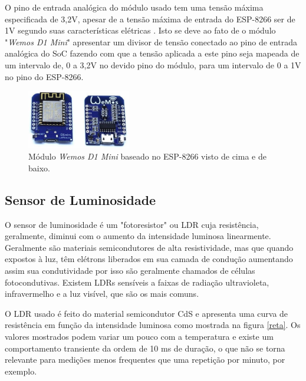 O pino de entrada analógica do módulo usado tem uma tensão máxima especificada de 3,2V, apesar de a tensão máxima de entrada do ESP-8266 ser de 1V segundo suas características elétricas \cite{esp}. Isto se deve ao fato de o módulo "\textit{Wemos D1 Mini}" apresentar um divisor de tensão conectado ao pino de entrada analógica do SoC fazendo com que a tensão aplicada a este pino seja mapeada de um intervalo de, 0 a 3,2V no devido pino do módulo, para um intervalo de 0 a 1V no pino do ESP-8266.

\begin{figure}[ht]
    \begin{center}
    \includegraphics[width=0.4\textwidth]{figuras/wemos.PNG}
    \end{center}
    \caption[Ilustração do módulo \textit{Wemos D1 Mini}.]{Módulo \textit{Wemos D1 Mini} baseado no ESP-8266 visto de cima e de baixo.}
    \label{wemos}
\end{figure}

\subsection{Sensor de Luminosidade}

O sensor de luminosidade é um "fotoresistor" ou \acf{LDR} cuja resistência, geralmente, diminui com o aumento da intensidade luminosa linearmente. Geralmente são materiais semicondutores de alta resistividade, mas que quando expostos à luz, têm elétrons liberados em sua camada de condução aumentando assim sua condutividade por isso são geralmente chamados de células fotocondutivas. Existem LDRs sensíveis a faixas de radiação ultravioleta, infravermelho e a luz visível, que são os mais comuns.

O LDR usado \cite{ldr} é feito do material semicondutor CdS e apresenta uma curva de resistência em função da intensidade luminosa como mostrada na figura \ref{reta}. Os valores mostrados podem variar um pouco com a temperatura e existe um comportamento transiente da ordem de 10 ms de duração, o que não se torna relevante para medições menos frequentes que uma repetição por minuto, por exemplo.

